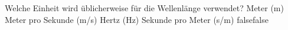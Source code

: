     {Welche Einheit wird üblicherweise für die Wellenlänge verwendet?}
    {Meter (m)}
    {Meter pro Sekunde (m/s)}
    {Hertz (Hz)}
    {Sekunde pro Meter (s/m)}
    {false}{false}
